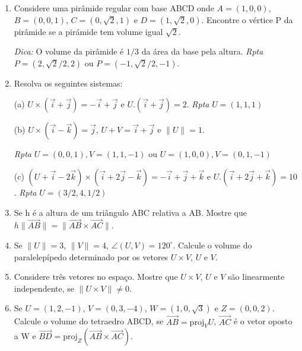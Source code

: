 \documentclass{article}
\theoremstyle{plain}
\theoremstyle{definition}
\theoremstyle{remark}
\begin{document}
\begin{enumerate}
  {\it Rpta} $(-1,-2,2)$ ou $(-1,4,-4)$.
  \item Considere uma pirâmide regular com base ABCD onde 
  $A=(1,0,0)$, $B=(0,0,1)$, $C=(0,\sqrt{2},1)$ e 
  $D=(1,\sqrt{2},0)$. 
  Encontre o vértice P da pirâmide se a pirámide tem volume igual 
  $\sqrt{2}$. 
  
  {\it Dica:} O volume da pirâmide é $1/3$ da área da base pela altura. 
  {\it Rpta} $P=(2,\sqrt{2}/2,2)$ ou $P=(-1,\sqrt{2}/2,-1)$.
  \item Resolva os seguintes sistemas:
  
   (a) $U \times (\overrightarrow{i}+\overrightarrow{j})=-\overrightarrow{i}
   +\overrightarrow{j}$ e $U . (\overrightarrow{i}+\overrightarrow{j})=2$. {\it Rpta} $U=(1,1,1)$
   
    (b) $U \times (\overrightarrow{i}-\overrightarrow{k})=\overrightarrow{j}$, 
    $U+V=\overrightarrow{i}+\overrightarrow{j}$ e $\|U\|=1$.
    
    {\it Rpta} $U=(0,0,1), V=(1,1,-1)$ ou $U=(1,0,0), V=(0,1,-1)$
    
    (c) $(U+\overrightarrow{i}-2\overrightarrow{k}) \times (\overrightarrow{i}+2\overrightarrow{j}-\overrightarrow{k})=-\overrightarrow{i}
   +\overrightarrow{j}+\overrightarrow{k}$ e 
   $U . (\overrightarrow{i}+2\overrightarrow{j}+\overrightarrow{k})=10$.
   {\it Rpta} $U=(3/2,4,1/2)$
  \item Se h é a altura de um triângulo ABC relativa a AB. 
  Mostre que $h \|\overrightarrow{AB}\|=
  \|\overrightarrow{AB}\times \overrightarrow{AC}\|$. 
  \item Se $\|U\|=3$, $\|V\|=4$, $\angle (U, V)=120^{\circ}$. Calcule o volume do paralelepípedo determinado por os vetores $U \times V$, $U$ e $V$.
  \item Considere três vetores no espaço. 
  Mostre que $U \times V$, $U$ e $V$ são linearmente independente, se
  $\|U \times V\|\neq 0$.
  \item Se $U=(1,2,-1)$, $V=(0,3,-4)$, $W=(1,0,\sqrt{3})$
  e $Z=(0,0,2)$. Calcule o volume do tetraedro ABCD, 
  se $\overrightarrow{AB}=\text{proj}_{V}U$, 
  $\overrightarrow{AC}$ é o vetor oposto a W 
  e $\overrightarrow{BD}=
  \text{proj}_{Z}(\overrightarrow{AB}\times \overrightarrow{AC})$.
  \end{enumerate}  
\end{document}
